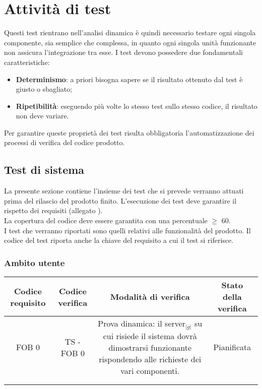 \section{Attività di test}{
	\label{sec:test}
	Questi test rientrano  nell’analisi dinamica è quindi necessario testare ogni singola componente, sia semplice 
	che complessa, in quanto ogni singola unità funzionante non assicura l'integrazione tra esse. I test devono 
	possedere due fondamentali caratteristiche:
	\begin{itemize}
		\item \textbf{Determinismo}: a priori bisogna sapere se il risultato ottenuto dal test è giusto o sbagliato;
		\item \textbf{Ripetibilità}: eseguendo più volte lo stesso test sullo stesso codice, il risultato non deve variare.
	\end{itemize}
	Per garantire queste proprietà dei test risulta obbligatoria l’automatizzazione dei processi di verifica del codice prodotto.\\
	\newpage
	\subsection{Test di sistema}{
		La presente sezione contiene l’insieme dei test che si prevede verranno attuati prima del rilascio del prodotto finito. 
		L’esecuzione dei test deve garantire il rispetto dei requisiti (allegato \textit{\AnalisiDeiRequisiti}).\\
		La copertura del codice deve essere garantita con una percentuale $\geqslant$ 60.\\
		I test che verranno riportati sono quelli relativi alle funzionalità del prodotto. 
		Il codice del test riporta anche la chiave del requisito a cui il test si riferisce.	
		
		\subsubsection{Ambito utente}{
			\begin{table}[h!]
				\begin{center}
				\scriptsize
						\begin{minipage}{1\linewidth}
							\begin{tabular}{c c c c}				
							\toprule
								Codice requisito& Codice verifica & Modalità di verifica & Stato della verifica \\ 
							\midrule	
							
							FOB 0
							&
							TS - FOB 0	
							& 
							\begin{minipage}{0.55\linewidth}
								Prova dinamica: il server$_{|g|}$ su cui risiede il sistema dovrà
								dimostrarsi funzionante rispondendo alle richieste dei vari
								componenti.
							\end{minipage}	
							&
							Pianificata
							\\
							\\
							\bottomrule
							\\
							

\end{tabular}
\end{minipage}
\end{center}
\end{table}}}}
